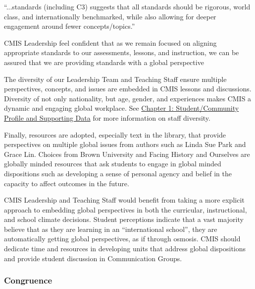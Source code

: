 \begin{findings}
“...standards (including C3) suggests that all standards should be rigorous, world class, and internationally benchmarked, while also allowing for deeper engagement around fewer concepts/topics.” 

CMIS Leadership feel confident that as we remain focused on aligning appropriate standards to our assessments, lessons, and instruction, we can be assured that we are providing standards with a global perspective 


The diversity of our Leadership Team and Teaching Staff ensure multiple perspectives, concepts, and issues are embedded in CMIS lessons and discussions. Diversity of not only nationality, but age, gender, and experiences makes CMIS a dynamic and engaging global workplace. See \href{https://docs.google.com/a/cmis.ac.th/document/d/1xv5c4vDAjs6UksU69e5l8UEZu0kYYJblDoKUj-29iXE/edit?usp=sharing}{Chapter 1: Student/Community Profile and Supporting Data} for more information on staff diversity. 


Finally, resources are adopted, especially text in the library, that provide perspectives on multiple global issues from authors such as Linda Sue Park and Grace Lin. Choices from Brown University and Facing History and Ourselves are globally minded resources that ask students to engage in global minded dispositions such as developing a sense of personal agency and belief in the capacity to affect outcomes in the future. 


CMIS Leadership and Teaching Staff would benefit from taking a more explicit approach to embedding global perspectives in both the curricular,  instructional, and school climate decisions. Student perceptions indicate that a vast majority believe that as they are learning in an “international school”, they are automatically getting global perspectives, as if through osmosis.  CMIS should dedicate time and resources in developing units that address global dispositions and provide student discussion in Communication Groups. 
\end{findings}

\subsubsection{Congruence}


